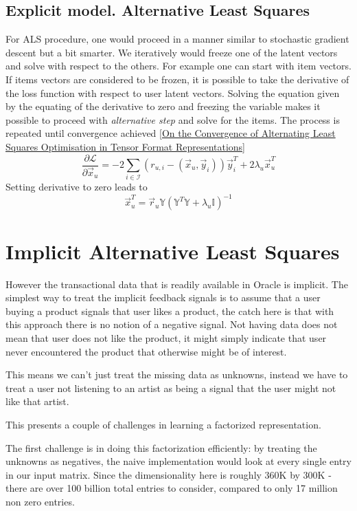 \documentclass[12pt]{article}
\begin{document}
\subsection{Explicit model. Alternative Least Squares}\label{eals}
For ALS procedure, one would proceed in a manner similar to stochastic gradient descent but a bit smarter. We iteratively would freeze one of the latent vectors and solve with respect to the others. For example one can start with item vectors. If items vectors are considered to be frozen, it is possible to  take the derivative of the loss function with respect to user latent vectors. Solving the equation given by the equating of the derivative to zero and freezing the variable makes it possible to proceed with {\it{alternative step}} and solve for the items. The process is repeated until convergence achieved \ref{On the Convergence of Alternating Least Squares Optimisation in Tensor Format Representations}
\begin{equation}
\frac{\partial \mathcal{L}}{\partial \vec{x}_u}  = -2 \sum_{i \in \mathcal{I}} \left(r_{u,i}-(\vec{x}_u, \vec{y}_i)\right) \vec{y}_i^T+
2\lambda_u \vec{x}_u^{T}
\end{equation}
Setting derivative to zero leads to 
\begin{equation}
\vec{x}_u^T  = \vec{r}_u\mathbb{Y}\left(\mathbb{Y}^T\mathbb{Y}+\lambda_u\mathbb{I}\right)^{-1}
\end{equation}


\section{Implicit Alternative Least Squares}\label{ials}
However the transactional data that is readily available in Oracle is implicit. The simplest way to treat the implicit feedback signals is to assume that a user  buying a product signals that user likes a product, the catch here is that with this approach there is no notion of a negative signal. Not having data does not mean that user does not like the product, it might simply indicate that user never encountered the product that otherwise might be of interest.

This means we can't just treat the missing data as unknowns, instead we have to treat a user not listening to an artist as being a signal that the user might not like that artist.

This presents a couple of challenges in learning a factorized representation.

The first challenge is in doing this factorization efficiently: by treating the unknowns as negatives, the naive implementation would look at every single entry in our input matrix. Since the dimensionality here is roughly 360K by 300K - there are over 100 billion total entries to consider, compared to only 17 million non zero entries.
\end{document}
